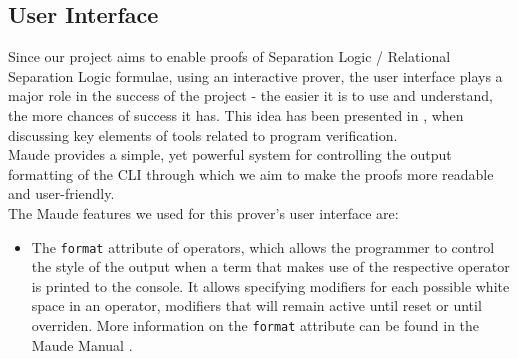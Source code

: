 \documentclass[12pt,a4paper]{article}
\begin{document}
{\subsection{User Interface}
Since our project aims to enable proofs of Separation Logic / Relational Separation Logic formulae, using an interactive prover, the user interface plays a major role in the success of the project - the easier it is to use and understand, the more chances of success it has. This idea has been presented in \cite{primer}, when discussing key elements of tools related to program verification. \\

Maude provides a simple, yet powerful system for controlling the output formatting of the CLI through which we aim to make the proofs more readable and user-friendly. \\

The Maude features we used for this prover's user interface are:
\begin{itemize}
	\item The \texttt{format} attribute of operators, which allows the programmer to control the style of the output when a term that makes use of the respective operator is printed to the console. It allows specifying modifiers for each possible white space in an operator, modifiers that will remain active until reset or until overriden. More information on the \texttt{format} attribute can be found in the Maude Manual \cite{manual}. 
	

\end{itemize}}
\end{document}
